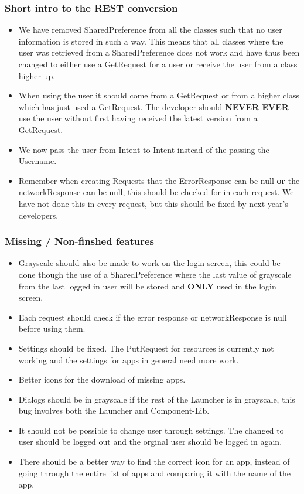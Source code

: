 \subsubsection{Short intro to the REST conversion}
\begin{itemize}
  \item We have removed SharedPreference from all the classes such that
  no user information is stored in such a way. This means that all classes where the
  user was retrieved from a SharedPreference does not work and have thus
  been changed to either use a GetRequest for a user or receive
  the user from a class higher up.
  \item When using the user it should come from a GetRequest or from a
  higher class which has just used a GetRequest. The developer
  should \textbf{NEVER EVER} use the user without first having received the
  latest version from a GetRequest. 
  \item We now pass the user from Intent to Intent instead of
  the passing the Username.
  \item Remember when creating Requests that the ErrorResponse
  can be null \textbf{or} the networkResponse can be
  null, this should be checked for in each request. We have not done
  this in every request, but this should be fixed by next year's developers.
\end{itemize}

\subsubsection{Missing / Non-finshed features}

\begin{itemize}
  \item Grayscale should also be made to work on the login screen, this
  could be done though the use of a SharedPreference where the last
  value of grayscale from the last logged in user will be stored and
  \textbf{ONLY} used in the login screen.
  \item Each request should check if the error response or networkResponse is
  null before using them.
  \item Settings should be fixed. The PutRequest for resources
  is currently not working and the settings for apps in general need more work.
  \item Better icons for the download of missing apps.
  \item Dialogs should be in grayscale if the rest of the
  Launcher is in grayscale, this bug involves both the Launcher
  and Component-Lib.
  \item It should not be possible to change user through settings. The changed
  to user should be logged out and the orginal user should be logged in again.
  \item There should be a better way to find the correct icon for an app,
  instead of going through the entire list of apps and comparing it with the
  name of the app.
\end{itemize}

